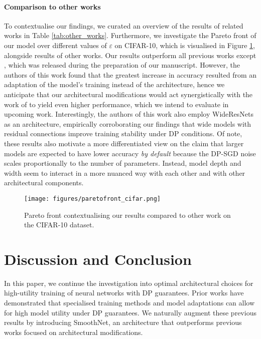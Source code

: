 \documentclass[nohyperref]{article}
\theoremstyle{plain}
\theoremstyle{definition}
\theoremstyle{remark}
\begin{document}
\paragraph{Comparison to other works}
To contextualise our findings, we curated an overview of the results of related works in Table \ref{tab:other_works}. Furthermore, we investigate the Pareto front of our model over different values of $\varepsilon$ on CIFAR-10, which is visualised in Figure \ref{fig:pareto}, alongside results of other works. Our results outperform all previous works except \citealt{de2022unlocking}, which was released during the preparation of our manuscript. However, the authors of this work found that the greatest increase in accuracy resulted from an adaptation of the model's training instead of the architecture, hence we anticipate that our architectural modifications would act synergistically with the work of \citealt{de2022unlocking} to yield even higher performance, which we intend to evaluate in upcoming work. Interestingly, the authors of this work also employ WideResNets as an architecture, empirically corroborating our findings that wide models with residual connections improve training stability under \acs{DP} conditions. Of note, these results also motivate a more differentiated view on the claim that larger models are expected to have lower accuracy \textit{by default} because the DP-SGD noise scales proportionally to the number of parameters. Instead, model depth and width seem to interact in a more nuanced way with each other and with other architectural components.
\begin{figure}
    \centering
    \texttt{[image: figures/paretofront\_cifar.png]}
    \caption{Pareto front contextualising our results compared to other work on the CIFAR-10 dataset.}
    \label{fig:pareto}
\end{figure}

\section{Discussion and Conclusion}
In this paper, we continue the investigation into optimal architectural choices for high-utility training of neural networks with DP guarantees. Prior works have demonstrated that specialised training methods and model adaptations can allow for high model utility under \acs{DP} guarantees. We naturally augment these previous results by introducing SmoothNet, an architecture that outperforms previous works focused on architectural modifications.
\end{document}
